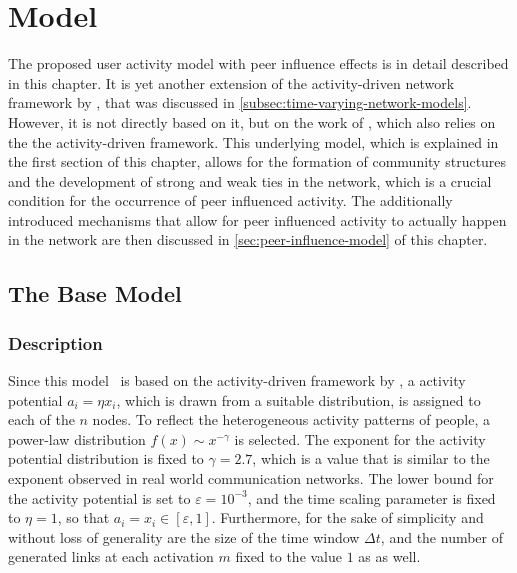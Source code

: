\chapter{Model}
\label{cha:model}


The proposed user activity model with peer influence effects is in detail described in this chapter.
It is yet another extension of the activity-driven network framework by \citet{Perra2012a}, that was discussed in \cref{subsec:time-varying-network-models}.
However, it is not directly based on it, but on the work of \citet{Laurent2015}, which also relies on the the activity-driven framework.
This underlying model, which is explained in the first section of this chapter, allows for the formation of community structures and the development of strong and weak ties in the network, which is a crucial condition for the occurrence of peer influenced activity.
The additionally introduced mechanisms that allow for peer influenced activity to actually happen in the network are then discussed in \cref{sec:peer-influence-model} of this chapter.




\section{The Base Model}
\label{sec:base-model}


\subsection{Description}

Since this model~\cite{Laurent2015} is based on the activity-driven framework by \citet{Perra2012a}, a activity potential \( a_{i} = \eta x_{i}\),  which is drawn from a suitable distribution, is assigned to each of the \( n \) nodes.
To reflect the heterogeneous activity patterns of people, a power-law distribution \( f(x) \sim x^{-\gamma}\) is selected.
The exponent for the activity potential distribution is fixed to \( \gamma = 2.7 \), which is a value that is similar to the exponent observed in real world communication networks.
The lower bound for the activity potential is set to \( \varepsilon = 10^{-3} \), and the time scaling parameter is fixed to \( \eta = 1\), so that \( a_{i} = x_{i} \in [\varepsilon, 1] \).
Furthermore, for the sake of simplicity and without loss of generality are the size of the time window \( \Delta t \), and the number of generated links at each activation \( m \) fixed to the value \(1\) as as well.

